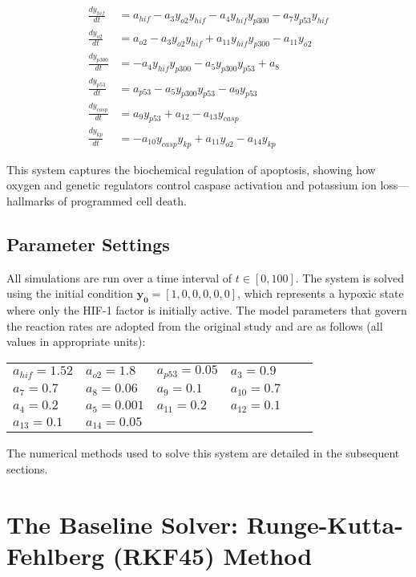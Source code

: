 \documentclass[conference]{IEEEtran}
\begin{document}
\begin{align}
\frac{dy_{hif}}{dt} &= a_{hif} - a_3 y_{o2} y_{hif} - a_4 y_{hif} y_{p300} - a_7 y_{p53} y_{hif} \\
\frac{dy_{o2}}{dt} &= a_{o2} - a_3 y_{o2} y_{hif} + a_{11} y_{hif} y_{p300} - a_{11} y_{o2} \\
\frac{dy_{p300}}{dt} &= -a_4 y_{hif} y_{p300} - a_5 y_{p300} y_{p53} + a_8 \\
\frac{dy_{p53}}{dt} &= a_{p53} - a_5 y_{p300} y_{p53} - a_9 y_{p53} \\
\frac{dy_{casp}}{dt} &= a_9 y_{p53} + a_{12} - a_{13} y_{casp} \\
\frac{dy_{kp}}{dt} &= -a_{10} y_{casp} y_{kp} + a_{11} y_{o2} - a_{14} y_{kp}
\end{align}

This system captures the biochemical regulation of apoptosis, showing how oxygen and genetic regulators control caspase activation and potassium ion loss—hallmarks of programmed cell death.

\subsection{Parameter Settings}
All simulations are run over a time interval of $t \in [0, 100]$. The system is solved using the initial condition $\mathbf{y_0} = [1, 0, 0, 0, 0, 0]$, which represents a hypoxic state where only the HIF-1 factor is initially active. The model parameters that govern the reaction rates are adopted from the original study and are as follows (all values in appropriate units):

\begin{center}
\begin{tabular}{llllll}
$a_{hif} = 1.52$ & $a_{o2} = 1.8$ & $a_{p53} = 0.05$ & $a_3 = 0.9$  \\
$a_7 = 0.7$ & $a_8 = 0.06$ & $a_9 = 0.1$ & $a_{10} = 0.7$  \\
$a_4 = 0.2$ & $a_5 = 0.001$ & $a_{11} = 0.2$ & $a_{12} = 0.1$ \\
$a_{13} = 0.1$ & $a_{14} = 0.05$ \\
\end{tabular}
\end{center}

The numerical methods used to solve this system are detailed in the subsequent sections.

\section{The Baseline Solver: Runge-Kutta-Fehlberg (RKF45) Method}
\end{document}
